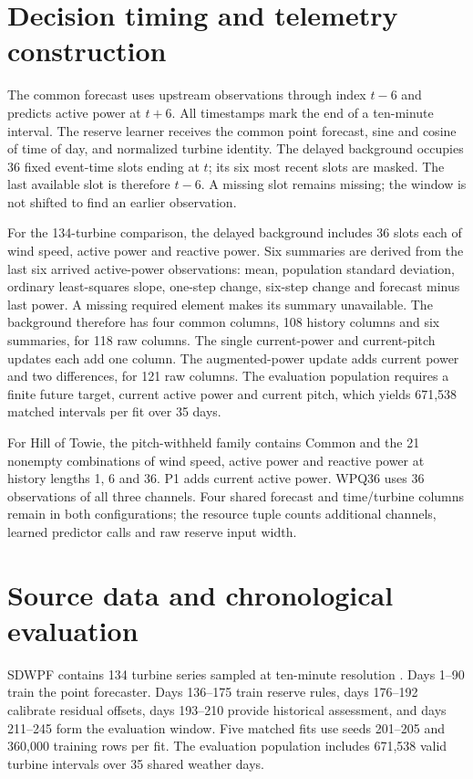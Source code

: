 \section{Decision timing and telemetry construction}
The common forecast uses upstream observations through index $t-6$ and predicts active power at $t+6$. All timestamps mark the end of a ten-minute interval. The reserve learner receives the common point forecast, sine and cosine of time of day, and normalized turbine identity. The delayed background occupies 36 fixed event-time slots ending at $t$; its six most recent slots are masked. The last available slot is therefore $t-6$. A missing slot remains missing; the window is not shifted to find an earlier observation.

For the 134-turbine comparison, the delayed background includes 36 slots each of wind speed, active power and reactive power. Six summaries are derived from the last six arrived active-power observations: mean, population standard deviation, ordinary least-squares slope, one-step change, six-step change and forecast minus last power. A missing required element makes its summary unavailable. The background therefore has four common columns, 108 history columns and six summaries, for 118 raw columns. The single current-power and current-pitch updates each add one column. The augmented-power update adds current power and two differences, for 121 raw columns. The evaluation population requires a finite future target, current active power and current pitch, which yields 671,538 matched intervals per fit over 35 days.

For Hill of Towie, the pitch-withheld family contains Common and the 21 nonempty combinations of wind speed, active power and reactive power at history lengths 1, 6 and 36. P1 adds current active power. WPQ36 uses 36 observations of all three channels. Four shared forecast and time/turbine columns remain in both configurations; the resource tuple counts additional channels, learned predictor calls and raw reserve input width.

\section{Source data and chronological evaluation}
SDWPF contains 134 turbine series sampled at ten-minute resolution \cite{zhou2024sdwpfdata}. Days 1--90 train the point forecaster. Days 136--175 train reserve rules, days 176--192 calibrate residual offsets, days 193--210 provide historical assessment, and days 211--245 form the evaluation window. Five matched fits use seeds 201--205 and 360,000 training rows per fit. The evaluation population includes 671,538 valid turbine intervals over 35 shared weather days.

